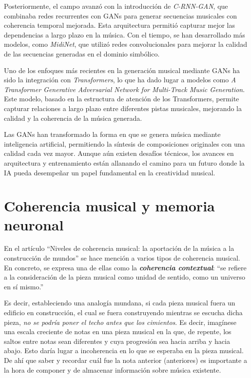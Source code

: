 Posteriormente, el campo avanzó con la introducción de \emph{C-RNN-GAN}, que combinaba redes recurrentes con GANs para generar secuencias musicales con coherencia temporal mejorada. Esta arquitectura permitió capturar mejor las dependencias a largo plazo en la música. Con el tiempo, se han desarrollado más modelos, como \emph{MidiNet}, que utilizó redes convolucionales para mejorar la calidad de las secuencias generadas en el dominio simbólico.

Uno de los enfoques más recientes en la generación musical mediante GANs ha sido la integración con \emph{Transformers}, lo que ha dado lugar a modelos como \emph{A Transformer Generative Adversarial Network for Multi-Track Music Generation}. Este modelo, basado en la estructura de atención de los Transformers, permite capturar relaciones a largo plazo entre diferentes pistas musicales, mejorando la calidad y la coherencia de la música generada.

Las GANs han transformado la forma en que se genera música mediante inteligencia artificial, permitiendo la síntesis de composiciones originales con una calidad cada vez mayor. Aunque aún existen desafíos técnicos, los avances en arquitectura y entrenamiento están allanando el camino para un futuro donde la IA pueda desempeñar un papel fundamental en la creatividad musical.

\section{Coherencia musical y memoria neuronal}

En el artículo ``Niveles de coherencia musical: la aportación de la música a la construcción de mundos''\citep{sibetrans2025coherencia} se hace mención a varios tipos de coherencia musical. En concreto, se expresa una de ellas como la \emph{\textbf{coherencia contextual}}: ``se refiere a la consideración de la pieza musical como unidad de sentido, como un universo en sí mismo.''

Es decir, estableciendo una analogía mundana, si cada pieza musical fuera un edificio en construcción, el cual se fuera construyendo mientras se escucha dicha pieza, \emph{no se podría poner el techo antes que los cimientos}. Es decir, imagínese una escala creciente de notas en una pieza musical en la que, de repente, los saltos entre notas sean diferentes y cuya progresión sea hacia arriba y hacia abajo. Esto daría lugar a incoherencia en lo que se esperaba en la pieza musical. De ahí que saber y recordar cuál fue la nota anterior (anteriores) es importante a la hora de componer y de almacenar información sobre música existente.

